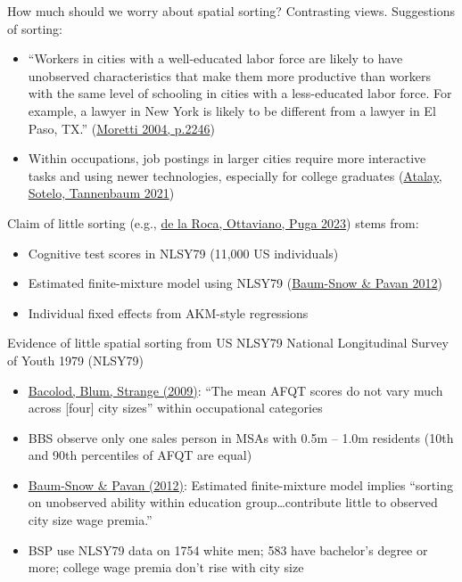 \documentclass[11pt,notes=hide,aspectratio=169]{beamer}
\begin{document}
\begin{frame}{How much should we worry about spatial sorting?}
Contrasting views.
Suggestions of sorting:
\begin{itemize}
	\item  {\small ``Workers in cities with a well-educated labor force are likely to have unobserved characteristics that make them more productive than workers with the same level of schooling in cities with a less-educated labor force. For example, a lawyer in New York is likely to be different from a lawyer in El Paso, TX.'' (\href{https://ideas.repec.org/h/eee/regchp/4-51.html}{Moretti 2004, p.2246})\par}
	\item {Within occupations, job postings in larger cities require more interactive tasks and using newer technologies, especially for college graduates (\href{http://www-personal.umich.edu/~ssotelo/research/AST_geography.pdf}{Atalay, Sotelo, Tannenbaum 2021})}
	\end{itemize}
Claim of little sorting (e.g., \href{http://diegopuga.org/research/dreams.pdf}{de la Roca, Ottaviano, Puga 2023}) stems from:
\begin{itemize}
	\item Cognitive test scores in NLSY79 (11,000 US individuals)
	\item Estimated finite-mixture model using NLSY79 (\href{https://ideas.repec.org/a/oup/restud/v79y2012i1p88-127.html}{Baum-Snow \& Pavan 2012})
\item Individual fixed effects from AKM-style regressions
\end{itemize}
\end{frame}
\begin{frame}{Evidence of little spatial sorting from US NLSY79}
National Longitudinal Survey of Youth 1979 (NLSY79)
\begin{itemize}
	\item \href{http://econpapers.repec.org/article/eeejuecon/v_3a65_3ay_3a2009_3ai_3a2_3ap_3a136-153.htm}{Bacolod, Blum, Strange (2009)}: ``The mean AFQT scores do not vary much across [four] city sizes'' within occupational categories
	\item BBS observe only one sales person in MSAs with 0.5m -- 1.0m residents (10th and 90th percentiles of AFQT are equal) \hyperlink{BBS2009tab5}{}
	\item \href{https://ideas.repec.org/a/oup/restud/v79y2012i1p88-127.html}{Baum-Snow \& Pavan (2012)}: Estimated finite-mixture model implies ``sorting on unobserved ability within education group\dots contribute little to observed city size wage premia.''
	\item BSP use NLSY79 data on 1754 white men; 583 have bachelor's degree or more; college wage premia don't rise with city size \hyperlink{BSPvsCensus}{}
\end{itemize}
\hypertarget{NLSY_main}{}
\end{frame}
\end{document}

